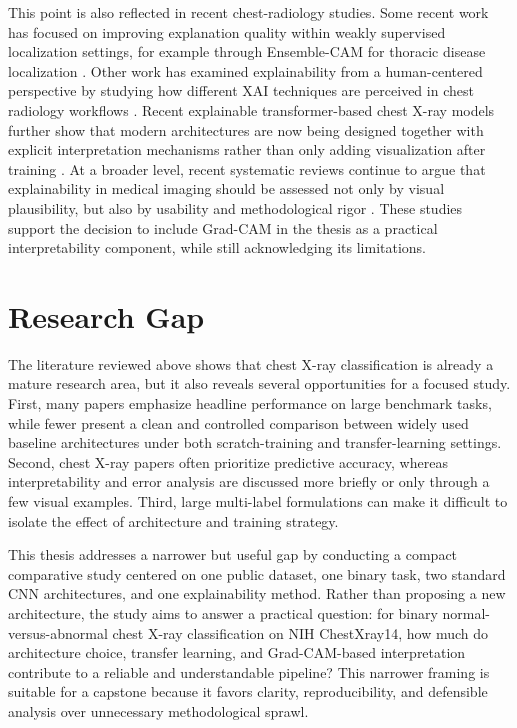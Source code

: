 This point is also reflected in recent chest-radiology studies. Some recent work has focused on improving explanation quality within weakly supervised localization settings, for example through Ensemble-CAM for thoracic disease localization \cite{ref:aasem2024}. Other work has examined explainability from a human-centered perspective by studying how different XAI techniques are perceived in chest radiology workflows \cite{ref:ihongbe2024}. Recent explainable transformer-based chest X-ray models further show that modern architectures are now being designed together with explicit interpretation mechanisms rather than only adding visualization after training \cite{ref:fu2025hybrid}. At a broader level, recent systematic reviews continue to argue that explainability in medical imaging should be assessed not only by visual plausibility, but also by usability and methodological rigor \cite{ref:ahmed2026xai}. These studies support the decision to include Grad-CAM in the thesis as a practical interpretability component, while still acknowledging its limitations.

\section{Research Gap}
The literature reviewed above shows that chest X-ray classification is already a mature research area, but it also reveals several opportunities for a focused study. First, many papers emphasize headline performance on large benchmark tasks, while fewer present a clean and controlled comparison between widely used baseline architectures under both scratch-training and transfer-learning settings. Second, chest X-ray papers often prioritize predictive accuracy, whereas interpretability and error analysis are discussed more briefly or only through a few visual examples. Third, large multi-label formulations can make it difficult to isolate the effect of architecture and training strategy.

This thesis addresses a narrower but useful gap by conducting a compact comparative study centered on one public dataset, one binary task, two standard CNN architectures, and one explainability method. Rather than proposing a new architecture, the study aims to answer a practical question: for binary normal-versus-abnormal chest X-ray classification on NIH ChestXray14, how much do architecture choice, transfer learning, and Grad-CAM-based interpretation contribute to a reliable and understandable pipeline? This narrower framing is suitable for a capstone because it favors clarity, reproducibility, and defensible analysis over unnecessary methodological sprawl.


